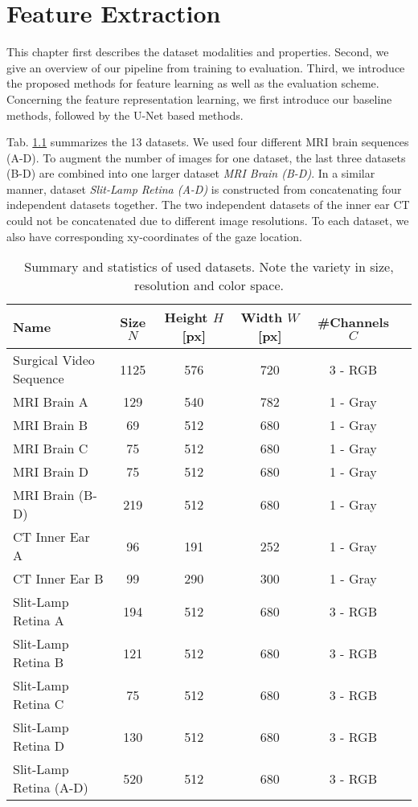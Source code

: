 \chapter{Feature Extraction}
\label{ch:methods}
This chapter first describes the dataset modalities and properties. Second, we give an overview of our pipeline from training to evaluation. Third, we introduce the proposed methods for feature learning as well as the evaluation scheme. Concerning the feature representation learning, we first introduce our baseline methods, followed by the U-Net based methods.

Tab. \ref{tab:dataset_stat} summarizes the 13 datasets. We used four different MRI brain sequences (A-D). To augment the number of images for one dataset, the last three datasets (B-D) are combined into one larger dataset \textit{MRI Brain (B-D)}. In a similar manner, dataset \textit{Slit-Lamp Retina (A-D)} is constructed from concatenating four independent datasets together. The two independent datasets of the inner ear CT could not be concatenated due to different image resolutions. To each dataset, we also have corresponding xy-coordinates of the gaze location.

\begin{table}[ht]
   \centering
   \caption[Dataset statistics]{Summary and statistics of used datasets. Note the variety in size, resolution and color space.}
   \begin{tabular}{l|c|c|c|c|c}
      \toprule
      \textbf{Name} & \textbf{Size $N$} & \textbf{Height $H$ [px]} & \textbf{Width $W$ [px]} & \textbf{\#Channels $C$} \\
      \midrule
      Surgical Video Sequence & 1125 & 576 & 720 & 3 - RGB \\
      \midrule
      MRI Brain A & 129 & 540 & 782 & 1 - Gray \\
      MRI Brain B & 69 & 512 & 680 & 1 - Gray \\
      MRI Brain C & 75 & 512 & 680 & 1 - Gray \\
      MRI Brain D & 75 & 512 & 680 & 1 - Gray \\
      MRI Brain (B-D) & 219 & 512 & 680 & 1 - Gray \\
      \midrule
      CT Inner Ear A & 96 & 191 & 252 & 1 - Gray \\
      CT Inner Ear B & 99 & 290 & 300 & 1 - Gray \\
      \midrule
      Slit-Lamp Retina A & 194 & 512 & 680 & 3 - RGB \\
      Slit-Lamp Retina B & 121 & 512 & 680 & 3 - RGB \\
      Slit-Lamp Retina C & 75 & 512 & 680 & 3 - RGB \\
      Slit-Lamp Retina D & 130 & 512 & 680 & 3 - RGB \\
      Slit-Lamp Retina (A-D) & 520 & 512 & 680 & 3 - RGB \\
      \bottomrule
   \end{tabular}
   \label{tab:dataset_stat}
\end{table}

